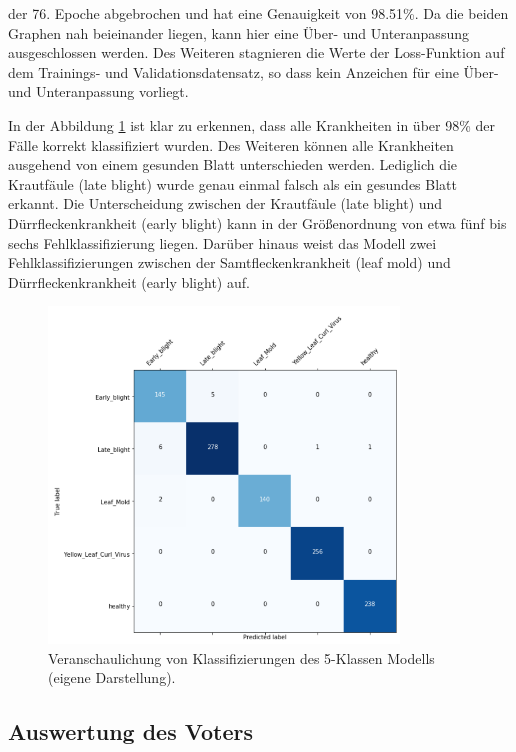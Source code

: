 \newpage
der 76. Epoche abgebrochen und hat eine Genauigkeit von 98.51\%. Da die beiden Graphen nah beieinander liegen, kann hier eine Über- und Unteranpassung ausgeschlossen werden. Des Weiteren stagnieren die Werte der Loss-Funktion auf dem Trainings- und Validationsdatensatz, so dass kein Anzeichen für eine Über- und Unteranpassung vorliegt.




In der Abbildung \ref{final_model_cm} ist klar zu erkennen, dass alle Krankheiten in über 98\% der Fälle korrekt klassifiziert wurden. Des Weiteren können alle Krankheiten ausgehend von einem gesunden Blatt unterschieden werden. Lediglich die Krautfäule (late blight) wurde genau einmal falsch als ein gesundes Blatt erkannt. Die Unterscheidung zwischen der Krautfäule (late blight) und Dürrfleckenkrankheit (early blight) kann in der Größenordnung von etwa fünf bis sechs Fehlklassifizierung liegen. Darüber hinaus weist das Modell zwei Fehlklassifizierungen zwischen der Samtfleckenkrankheit (leaf mold) und Dürrfleckenkrankheit (early blight) auf.

\begin{figure}[h!]
	\centering
	\includegraphics[width=0.83\textwidth]{model/final_model/final_model_cm.PNG}
	\caption{Veranschaulichung von Klassifizierungen des 5-Klassen Modells (eigene Darstellung).}
	\label{final_model_cm}
\end{figure}

\newpage
\subsection{Auswertung des Voters}

